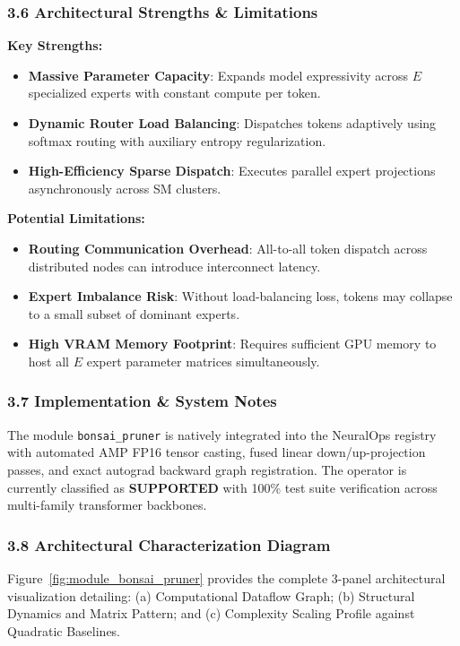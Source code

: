 \subsubsection*{3.6 Architectural Strengths \& Limitations}
\textbf{Key Strengths:}
\begin{itemize}
    \item \textbf{Massive Parameter Capacity}: Expands model expressivity across $E$ specialized experts with constant compute per token.
    \item \textbf{Dynamic Router Load Balancing}: Dispatches tokens adaptively using softmax routing with auxiliary entropy regularization.
    \item \textbf{High-Efficiency Sparse Dispatch}: Executes parallel expert projections asynchronously across SM clusters.
\end{itemize}

\textbf{Potential Limitations:}
\begin{itemize}
    \item \textbf{Routing Communication Overhead}: All-to-all token dispatch across distributed nodes can introduce interconnect latency.
    \item \textbf{Expert Imbalance Risk}: Without load-balancing loss, tokens may collapse to a small subset of dominant experts.
    \item \textbf{High VRAM Memory Footprint}: Requires sufficient GPU memory to host all $E$ expert parameter matrices simultaneously.
\end{itemize}

\subsubsection*{3.7 Implementation \& System Notes}
The module \texttt{bonsai\_pruner} is natively integrated into the NeuralOps registry with automated AMP FP16 tensor casting, fused linear down/up-projection passes, and exact autograd backward graph registration. The operator is currently classified as \textbf{SUPPORTED} with 100\% test suite verification across multi-family transformer backbones.

\subsubsection*{3.8 Architectural Characterization Diagram}
Figure~\ref{fig:module_bonsai_pruner} provides the complete 3-panel architectural visualization detailing: (a) Computational Dataflow Graph; (b) Structural Dynamics and Matrix Pattern; and (c) Complexity Scaling Profile against Quadratic Baselines.

